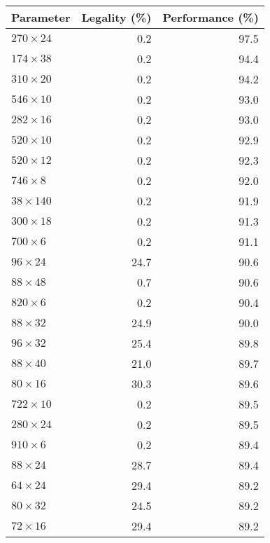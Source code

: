\begin{tabular}{lrr}
  \toprule
  Parameter & Legality (\%) & Performance (\%) \\
  \midrule
  $270 \times 24$ & 0.2 & 97.5 \\
  $174 \times 38$ & 0.2 & 94.4 \\
  $310 \times 20$ & 0.2 & 94.2 \\
  $546 \times 10$ & 0.2 & 93.0 \\
  $282 \times 16$ & 0.2 & 93.0 \\
  $520 \times 10$ & 0.2 & 92.9 \\
  $520 \times 12$ & 0.2 & 92.3 \\
  $746 \times 8$ & 0.2 & 92.0 \\
  $38 \times 140$ & 0.2 & 91.9 \\
  $300 \times 18$ & 0.2 & 91.3 \\
  $700 \times 6$ & 0.2 & 91.1 \\
  $96 \times 24$ & 24.7 & 90.6 \\
  $88 \times 48$ & 0.7 & 90.6 \\
  $820 \times 6$ & 0.2 & 90.4 \\
  $88 \times 32$ & 24.9 & 90.0 \\
  $96 \times 32$ & 25.4 & 89.8 \\
  $88 \times 40$ & 21.0 & 89.7 \\
  $80 \times 16$ & 30.3 & 89.6 \\
  $722 \times 10$ & 0.2 & 89.5 \\
  $280 \times 24$ & 0.2 & 89.5 \\
  $910 \times 6$ & 0.2 & 89.4 \\
  $88 \times 24$ & 28.7 & 89.4 \\
  $64 \times 24$ & 29.4 & 89.2 \\
  $80 \times 32$ & 24.5 & 89.2 \\
  $72 \times 16$ & 29.4 & 89.2 \\
  \bottomrule
\end{tabular}

